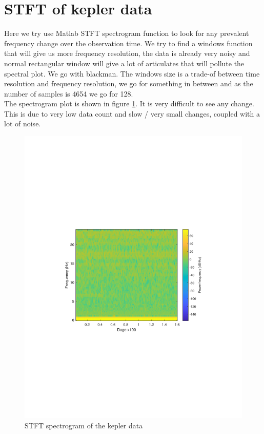 \section{STFT of kepler data}

Here we try use Matlab STFT spectrogram function to look for any prevalent frequency change over the observation time. 
We try to find a windows function that will give us more frequency resolution, the data is already very noisy and normal rectangular window will give a lot of articulates that will pollute the spectral plot. We go with blackman. The windows size is a trade-of between time resolution and frequency resolution, we go for something in between and as the number of samples is 4654 we go for 128.    
\\
The spectrogram plot is shown in figure \ref{fig:STFT}. It is very difficult to see any change. This is due to very low data count and slow / very small changes, coupled with a lot of noise. 

\begin{figure}[h]
  \centering
  \includegraphics[width=\textwidth]{matlabstuff/STFT.pdf}
  \caption{STFT spectrogram of the kepler data}%
  \label{fig:STFT}
\end{figure}

